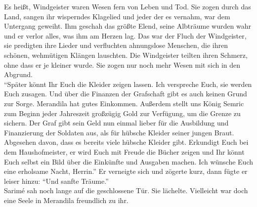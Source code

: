 Es heißt, Windgeister waren Wesen fern von Leben und Tod. Sie zogen durch das Land, sangen ihr 
wisperndes Klagelied und jeder der es vernahm, war dem Untergang geweiht. Ihm geschah das größte 
Elend, seine Albträume wurden wahr und er verlor alles, was ihm am Herzen lag. Das war der Fluch 
der Windgeister, sie predigten ihre Lieder und verfluchten ahnungslose Menschen, die ihren schönen, 
wehmütigen Klängen lauschten. Die Windgeister teilten ihren Schmerz, ohne dass er je kleiner wurde. 
Sie zogen nur noch mehr Wesen mit sich in den Abgrund.\\
``Später könnt Ihr Euch die Kleider zeigen lassen. Ich verspreche Euch, sie werden Euch zusagen. 
Und über die Finanzen der Grafschaft gibt es auch keinen Grund zur Sorge. Merandila hat gutes 
Einkommen. Außerdem stellt uns König Semric zum Beginn jeder Jahreszeit großzügig Gold zur 
Verfügung, um die Grenze zu sichern. Der Graf gibt sein Geld nun einmal lieber für die Ausbildung 
und Finanzierung der Soldaten aus, als für hübsche Kleider seiner jungen Braut. Abgesehen davon, 
dass es bereits viele hübsche Kleider gibt. Erkundigt Euch bei dem Haushofmeister, er wird Euch mit 
Freude die Bücher zeigen und Ihr könnt Euch selbst ein Bild über die Einkünfte und Ausgaben machen. 
Ich wünsche Euch eine erholsame Nacht, Herrin.'' Er verneigte sich und zögerte kurz, dann fügte er 
leiser hinzu: ``Und sanfte Träume.''\\
Sarimé sah noch lange auf die geschlossene Tür. Sie lächelte. Vielleicht war doch eine Seele in 
Merandila freundlich zu ihr. \\


